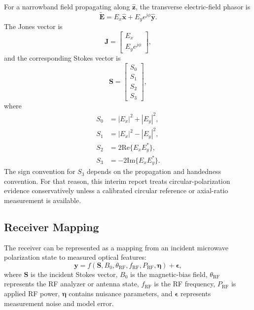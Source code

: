 \documentclass{ieeeaccess}
\begin{document}
For a narrowband field propagating along \(\hat{\mathbf{z}}\), the transverse electric-field phasor is
\begin{equation}
\tilde{\mathbf{E}}
=
E_x\hat{\mathbf{x}}
+
E_y e^{j\phi}\hat{\mathbf{y}}.
\label{eq:annex_field_phasor}
\end{equation}
The Jones vector is
\begin{equation}
\mathbf{J}
=
\begin{bmatrix}
E_x\\
E_y e^{j\phi}
\end{bmatrix},
\label{eq:annex_jones}
\end{equation}
and the corresponding Stokes vector is
\begin{equation}
\mathbf{S}
=
\begin{bmatrix}
S_0\\S_1\\S_2\\S_3
\end{bmatrix},
\label{eq:annex_stokes_vector}
\end{equation}
where
\begin{equation}
\begin{aligned}
S_0 &= |E_x|^2+|E_y|^2,\\
S_1 &= |E_x|^2-|E_y|^2,\\
S_2 &= 2\mathrm{Re}\{E_xE_y^\ast\},\\
S_3 &= -2\mathrm{Im}\{E_xE_y^\ast\}.
\end{aligned}
\label{eq:annex_stokes_components}
\end{equation}
The sign convention for \(S_3\) depends on the propagation and handedness convention. For that reason, this interim report treats circular-polarization evidence conservatively unless a calibrated circular reference or axial-ratio measurement is available.

\subsection{Receiver Mapping}
\label{annex:receiver_forward_model}

The receiver can be represented as a mapping from an incident microwave polarization state to measured optical features:
\begin{equation}
\mathbf{y}
=
f(\mathbf{S},B_0,\theta_{\mathrm{RF}},f_{\mathrm{RF}},P_{\mathrm{RF}},\boldsymbol{\eta})
+
\boldsymbol{\epsilon},
\label{eq:annex_forward_general_mapping}
\end{equation}
where \(\mathbf{S}\) is the incident Stokes vector, \(B_0\) is the magnetic-bias field, \(\theta_{\mathrm{RF}}\) represents the RF analyzer or antenna state, \(f_{\mathrm{RF}}\) is the RF frequency, \(P_{\mathrm{RF}}\) is applied RF power, \(\boldsymbol{\eta}\) contains nuisance parameters, and \(\boldsymbol{\epsilon}\) represents measurement noise and model error.
\end{document}
